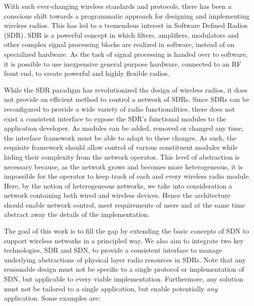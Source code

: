 With such ever-changing wireless standards and protocols, there has been a conscious shift towards a programmatic approach for designing and implementing wireless radios. This has led to a tremendous interest in Software Defined Radios (SDR). SDR is a powerful concept in which filters, amplifiers, modulators and other complex signal processing blocks are realized in software, instead of on specialized hardware. As the task of signal processing is handed over to software, it is possible to use inexpensive general purpose hardware, connected to an RF front end, to create powerful and highly flexible radios.  

While the SDR paradigm has revolutionized the design of wireless radios, it does not provide an efficient method to control a network of SDRs. Since SDRs can be reconfigured to provide a wide variety of radio functionalities, there does not exist a consistent interface to expose the SDR's functional modules to the application developer. As modules can be added, removed or changed any time, the interface framework must be able to adapt to these changes. As such, the requisite framework should allow control of various constituent modules while hiding their complexity from the network operator. This level of abstraction is necessary because, as the network grows and becomes more heterogeneous, it is impossible for the operator to keep track of each and every wireless radio module. Here, by the notion of heterogeneous networks, we take into consideration a network containing both wired and wireless devices. Hence the architecture should enable network control, meet requirements of users and at the same time abstract away the details of the implementation.

The goal of this work is to fill the gap by extending the basic concepts of SDN to support wireless networks in a principled way. We also aim to integrate two key technologies, SDR and SDN, to provide a consistent interface to manage underlying abstractions of physical layer radio resources in SDRs. Note that any reasonable design must not be specific to a single protocol or implementation of SDN, but applicable to every viable implementation. Furthermore, any solution must not be tailored to a single application, but enable potentially \emph{any} application. Some examples are:

